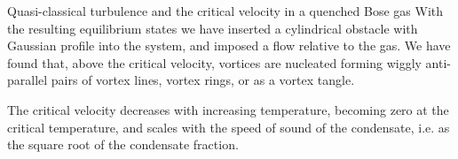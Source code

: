 \begin{chapter}{\label{cha:nonequib}Quasi-classical turbulence and the critical velocity in a quenched Bose gas}
With the resulting equilibrium states we have inserted a cylindrical obstacle with Gaussian profile into the system, and imposed a flow relative to the gas.  We have found that, above the critical velocity, vortices are nucleated forming wiggly anti-parallel pairs of vortex lines, vortex rings, or as a vortex tangle.

The critical velocity decreases with increasing temperature, becoming zero at the critical temperature, and scales with the speed of sound of the condensate, i.e. as the square root of the condensate fraction.
\end{chapter}